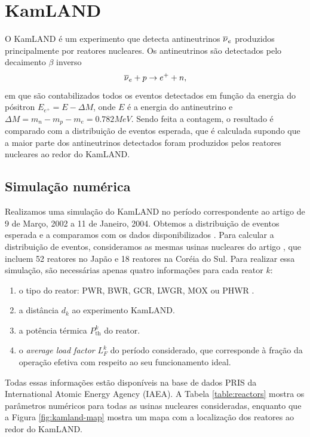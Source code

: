 \documentclass[12pt]{report}
\begin{document}
\section{KamLAND} \label{sec:kamland}

O KamLAND é um experimento que detecta antineutrinos $\overline{\nu}_e$ produzidos principalmente por reatores nucleares. Os antineutrinos são detectados pelo decaimento $\beta$ inverso
\begin{equation} \label{eq:inverse-beta}
\overline{\nu}_e + p \to e^+ + n,
\end{equation}
em que são contabilizados todos os eventos detectados em função da energia do pósitron $E_{e^+} = E - \Delta M$, onde $E$ é a energia do antineutrino e $\Delta M = m_n - m_p - m_e = 0.782 \unit{MeV}$. Sendo feita a contagem, o resultado é comparado com a distribuição de eventos esperada, que é calculada supondo que a maior parte dos antineutrinos detectados foram produzidos pelos reatores nucleares ao redor do KamLAND.

\subsection{Simulação numérica} \label{sec:kamland-simul}

Realizamos uma simulação do KamLAND no período correspondente ao artigo \cite{spectral-distortion} de 9 de Março, 2002 a 11 de Janeiro, 2004. Obtemos a distribuição de eventos esperada e a comparamos com os dados disponibilizados \cite{kamland-data}. Para calcular a distribuição de eventos, consideramos as mesmas usinas nucleares do artigo \cite{stanford-reactors}, que incluem 52 reatores no Japão e 18 reatores na Coréia do Sul. Para realizar essa simulação, são necessárias apenas quatro informações \cite{refmodel} para cada reator $k$:
\begin{enumerate}
\item o tipo do reator: PWR, BWR, GCR, LWGR, MOX ou PHWR \cite{refmodel}.
\item a distância $d_k$ ao experimento KamLAND.
\item a potência térmica $P_{\text{th}}^k$ do reator.
\item o \textit{average load factor} $L_F^k$ do período considerado, que corresponde à fração da operação efetiva com respeito ao seu funcionamento ideal.
\end{enumerate}

Todas essas informações estão disponíveis na base de dados PRIS \cite{pris-iaea} da International Atomic Energy Agency (IAEA). A Tabela \ref{table:reactors} mostra os parâmetros numéricos para todas as usinas nucleares consideradas, enquanto que a Figura \ref{fig:kamland-map} mostra um mapa com a localização dos reatores ao redor do KamLAND.
\end{document}
